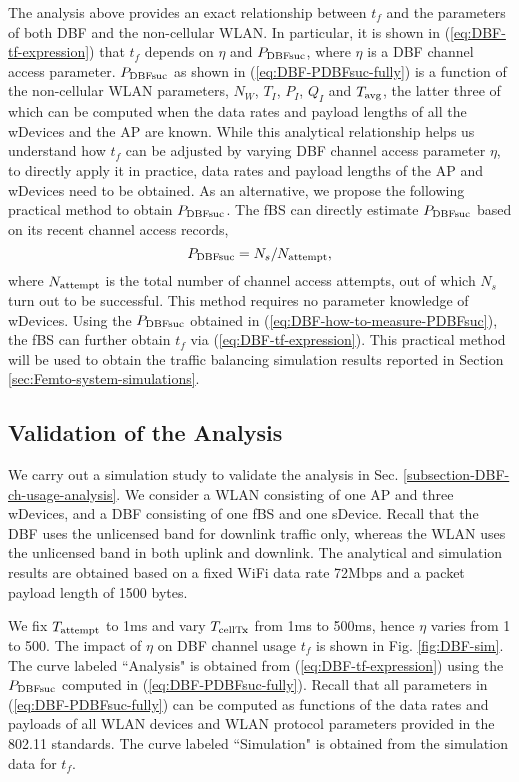 \documentclass[journal,final,letterpaper,10pt,doublecolumn,twoside]{IEEEtran}
\begin{document}
The analysis above provides an exact relationship between $t_f$ and the parameters of
both DBF and the non-cellular WLAN.
In particular, it is shown in (\ref{eq:DBF-tf-expression}) that
$t_f$ depends on $\eta$ and $P_{\textmd{DBFsuc}}$, where $\eta$ is a
DBF channel access parameter. $P_{\textmd{DBFsuc}}$ as shown in
(\ref{eq:DBF-PDBFsuc-fully}) is a function of the non-cellular WLAN
parameters, $N_W$, $T_I$, $P_I$, $Q_I$ and $T_{\textmd{avg}}$, the
latter three of which can be computed when the data rates and
payload lengths of all the wDevices and the AP are known. While this
analytical relationship helps us understand how $t_f$ can be
adjusted by varying DBF channel access parameter $\eta$, to directly apply it
in practice, data rates and payload lengths of the AP and wDevices need
to be obtained.  As an alternative, we propose the following
practical method to obtain $P_{\textmd{DBFsuc}}$. The fBS can
directly estimate $P_{\textmd{DBFsuc}}$ based on its recent channel
access records,
\begin{equation}
P_{\textmd{DBFsuc}} = N_{s} / N_{\textmd{attempt}} ,
\label{eq:DBF-how-to-measure-PDBFsuc}
\end{equation}
where $N_{\textmd{attempt}}$ is the total number of channel access
attempts,  out of which $N_{s}$ turn out to be successful.  This
method requires no parameter knowledge of wDevices. Using the $P_{\textmd{DBFsuc}}$ obtained in
(\ref{eq:DBF-how-to-measure-PDBFsuc}), the fBS can further obtain
$t_f$ via (\ref{eq:DBF-tf-expression}). This practical method will
be used to obtain the traffic balancing simulation results reported
in Section \ref{sec:Femto-system-simulations}.


\subsection{Validation of the Analysis}\label{subsection-DBF-sim}

We carry out a simulation study to validate the analysis in Sec.
\ref{subsection-DBF-ch-usage-analysis}. We consider a WLAN
consisting of one AP and three wDevices, and a DBF consisting of one
fBS and one sDevice.  Recall that the DBF uses the unlicensed band for
downlink traffic only, whereas the WLAN uses the unlicensed band in
both uplink and downlink. The analytical and simulation results are
obtained based on a fixed WiFi data rate 72Mbps and a packet payload
length of 1500 bytes.

We fix $T_{\textmd{attempt}}$ to 1ms and vary $T_{\textmd{cellTx}}$
from 1ms to 500ms, hence $\eta$ varies from 1 to 500. The impact of
$\eta$ on DBF channel usage $t_f$ is shown in Fig.
\ref{fig:DBF-sim}. The curve labeled ``Analysis" is obtained from
(\ref{eq:DBF-tf-expression}) using the $P_{\textmd{DBFsuc}}$
computed in (\ref{eq:DBF-PDBFsuc-fully}). Recall that all parameters
in (\ref{eq:DBF-PDBFsuc-fully}) can be computed as functions of the
data rates and payloads of all WLAN devices and WLAN protocol
parameters provided in the 802.11 standards. The curve labeled
``Simulation" is obtained from the simulation data for $t_f$.
\end{document}
